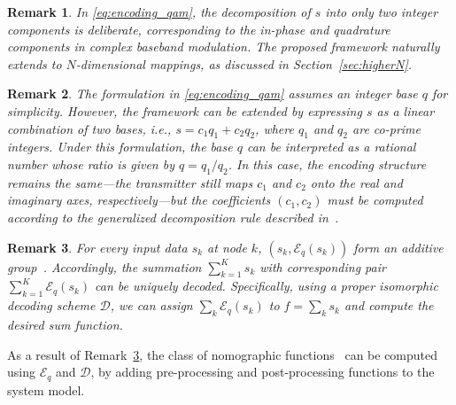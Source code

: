 \documentclass[journal,12pt,onecolumn,draftclsnofoot]{IEEEtran}
\newtheorem{remark}{Remark}
\theoremstyle{definition}
\begin{document}
\begin{remark}
In \eqref{eq:encoding_qam}, the decomposition of $s$ into only two integer components is deliberate, corresponding to the in-phase and quadrature components in complex baseband modulation.  The proposed framework naturally extends to $N$-dimensional mappings, as discussed in Section~\ref{sec:higherN}. 
\end{remark}


\begin{remark}\label{rem:rational}
The formulation in \eqref{eq:encoding_qam} assumes an integer base \( q \) for simplicity.  However, the framework can be extended by expressing \( s \) as a linear combination of two bases, i.e., \( s = c_1 q_1 + c_2 q_2 \), where \( q_1 \) and \( q_2 \) are co-prime integers. Under this formulation, the base \( q \) can be interpreted as a rational number whose ratio is given by \( q = q_1/q_2 \).  In this case, the encoding structure remains the same—the transmitter still maps \( c_1 \) and \( c_2 \) onto the real and imaginary axes, respectively—but the coefficients \( (c_1, c_2) \) must be computed according to the generalized decomposition rule described in~\cite{Razavikia2024Ring}. 
\end{remark}



\begin{remark}\label{rem:addative}
    For every input data $s_k$ at node $k$,  $(s_k,\mathscr{E}_q(s_k))$ form an additive group~\cite{Razavikia2024Ring}. Accordingly, the summation $\sum_{k=1}^Ks_k$ with corresponding pair $\sum_{k=1}^K\mathscr{E}_q(s_k)$ can be uniquely decoded.  Specifically, using a proper isomorphic decoding scheme $\mathscr{D}$, we can assign $\sum_k\mathscr{E}_q(s_k)$ to  $f = \sum_ks_k$ and compute the desired sum function. 
\end{remark}

As a result of Remark~\ref{rem:addative}, the class of nomographic functions~\cite{goldenbaum2014nomographic} can be computed using $\mathscr{E}_{q}$ and $\mathscr{D}$, by adding pre-processing and post-processing functions to the system model. 
\end{document}
